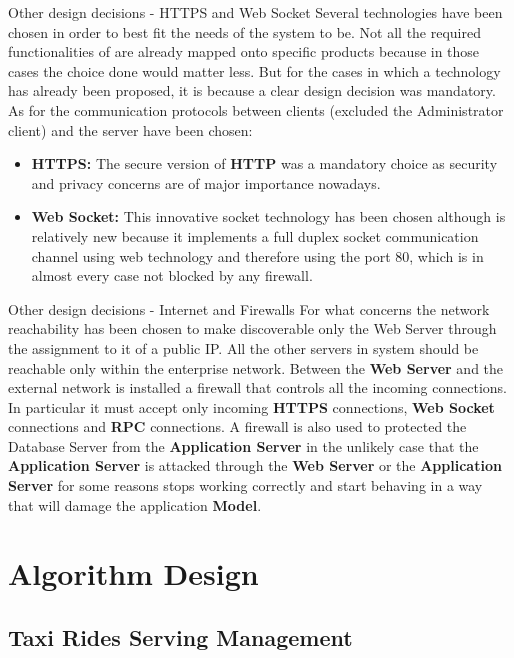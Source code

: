 \documentclass{../common/latex_classes/pdf_presentation}
\newcommand{\itemBold}[1]{\item\textbf{#1:}}
\begin{document}
	\begin{frame}{Other design decisions - HTTPS and Web Socket}
		Several technologies have been chosen in order to best fit the needs of the system to be.
		Not all the required functionalities of \myTaxiService{} are already mapped onto specific products because in those cases the choice done would matter less.
		But for the cases in which a technology has already been proposed, it is because a clear design decision was mandatory.
		As for the communication protocols between clients (excluded the Administrator client) and the server have been chosen:
		\begin{itemize}
			\itemBold{HTTPS} The secure version of \textbf{HTTP} was a mandatory choice as security and privacy concerns are of major importance nowadays.
			\itemBold{Web Socket} This innovative socket technology has been chosen although is relatively new because it implements a full duplex socket communication channel using web technology and therefore using the port 80, which is in almost every case not blocked by any firewall.
		\end{itemize}
	\end{frame}
	
	
	\begin{frame}{Other design decisions - Internet and Firewalls}
		For what concerns the network reachability has been chosen to make discoverable only the Web Server through the assignment to it of a public IP.
		All the other servers in \myTaxiService{} system should be reachable only within the enterprise network.
		Between the \textbf{Web Server} and the external network is installed a firewall that controls all the incoming connections.
		In particular it must accept only incoming \textbf{HTTPS} connections, \textbf{Web Socket} connections and \textbf{RPC} connections.
		A firewall is also used to protected the Database Server from the \textbf{Application Server} in the unlikely case that the \textbf{Application Server} is attacked through the \textbf{Web Server} or the \textbf{Application Server} for some reasons stops working correctly and start behaving in a way that will damage the application \textbf{Model}.
	\end{frame}
	
	
	\section{Algorithm Design}
	
	\subsection{Taxi Rides Serving Management}
	
\end{document}
